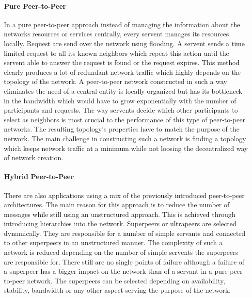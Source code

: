 \paragraph{Pure Peer-to-Peer}
In a pure peer-to-peer approach instead of managing the information about the
networks resources or services centrally, every servent manages its resources
locally. Request are send over the network using flooding. A servent sends a
time limited request to all its known neighbors which repeat this action until
the servent able to answer the request is found or the request expires. This
method clearly produces a lot of redundant network traffic which highly depends
on the topology of the network. A peer-to-peer network constructed in such a way
eliminates the need of a central entity is locally organized but has its
bottleneck in the bandwidth which would have to grow exponentially with the
number of participants and requests. The way servents decide which other
participants to select as neighbors is most crucial to the performance of this
type of peer-to-peer networks. The resulting topology's properties have to
match the purpose of the network. The main challenge in constructing such a
network is finding a topology which keeps network traffic at a minimum while not
loosing the decentralized way of network creation.
\paragraph{Hybrid Peer-to-Peer}
There are also applications using a mix of the previously introduced
peer-to-peer architectures. The main reason for this approach is to reduce
the number of messages while still using an unstructured approach. This is
achieved through introducing hierarchies into the network. Superpeers or
ultrapeers are selected dynamically. They are responsible for a number of simple
servants and connected to other superpeers in an unstructured manner. The complexity of such a network
is reduced depending on the number of simple servents the superpeers are
responsible for. There still are no single points of failure although a failure
of a superpeer has a bigger impact on the network than of a servant in a pure
peer-to-peer network. The superpeers can be selected depending on availability,
stability, bandwidth or any other aspect serving the purpose of the network.
